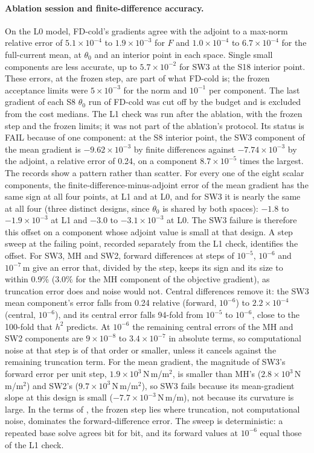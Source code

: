 \documentclass{anvil-paper}
\begin{document}
\paragraph{Ablation session and finite-difference accuracy.}
On the L0 model, FD-cold's gradients agree with the adjoint to a max-norm
relative error of $5.1\times10^{-4}$ to $1.9\times10^{-3}$ for $F$ and
$1.0\times10^{-4}$ to $6.7\times10^{-4}$ for the full-current mean, at
$\theta_0$ and an interior point in each space. Single small components are
less accurate, up to $5.7\times10^{-2}$ for SW3 at the S18 interior
point. These errors, at the frozen step, are part of what FD-cold is; the frozen
acceptance limits were $5\times10^{-3}$ for the norm and $10^{-1}$ per
component. The last gradient of each S8 $\theta_0$ run of FD-cold was cut
off by the budget and is excluded from the cost medians. The L1 check was
run after the ablation, with the frozen step
and the frozen limits; it was not part of the ablation's protocol. Its
status is FAIL because of one component: at the S8 interior point, the
SW3 component of the mean gradient is $-9.62\times10^{-3}$ by finite
differences against $-7.74\times10^{-3}$ by the adjoint, a relative error
of 0.24, on a component $8.7\times10^{-5}$ times the largest. The records
show a pattern rather than scatter. For every one of the eight scalar
components, the finite-difference-minus-adjoint error of the mean gradient
has the same sign at all four points, at L1 and at L0, and for SW3 it is
nearly the same at all four (three distinct designs, since $\theta_0$ is
shared by both spaces): $-1.8$ to $-1.9\times10^{-3}$ at L1 and $-3.0$ to
$-3.1\times10^{-3}$ at L0. The SW3 failure is therefore this offset on a component whose adjoint
value is small at that design. A step sweep at the failing point,
recorded separately from the L1 check, identifies the offset. For SW3, MH
and SW2, forward differences at steps of $10^{-5}$, $10^{-6}$ and
$10^{-7}$\,m give an error that, divided by the step, keeps its sign and
its size to within 0.9\% (3.0\% for the MH component of the objective
gradient), as truncation error does and noise would not. Central
differences remove it: the SW3 mean component's error falls from 0.24
relative (forward, $10^{-6}$) to $2.2\times10^{-4}$ (central, $10^{-6}$),
and its central error falls 94-fold from $10^{-5}$ to $10^{-6}$, close to
the 100-fold that $h^2$ predicts. At $10^{-6}$ the remaining central errors
of the MH and SW2 components are $9\times10^{-8}$ to $3.4\times10^{-7}$ in
absolute terms, so computational noise at that step is of that order or
smaller, unless it cancels against the remaining truncation term. For the
mean gradient, the magnitude of SW3's forward error per unit step,
$1.9\times10^{3}$\,N\,m/m$^2$, is smaller than MH's
($2.8\times10^{3}$\,N\,m/m$^2$) and SW2's ($9.7\times10^{3}$\,N\,m/m$^2$), so SW3 fails because its mean-gradient
slope at this design is small ($-7.7\times10^{-3}$\,N\,m/m), not because
its curvature is large. In the terms of \citet{more2011estimating,more2012estimating},
the frozen step lies where truncation, not computational noise, dominates
the forward-difference error. The sweep is deterministic: a repeated base
solve agrees bit for bit, and its forward values at $10^{-6}$ equal those of
the L1 check.
\end{document}
